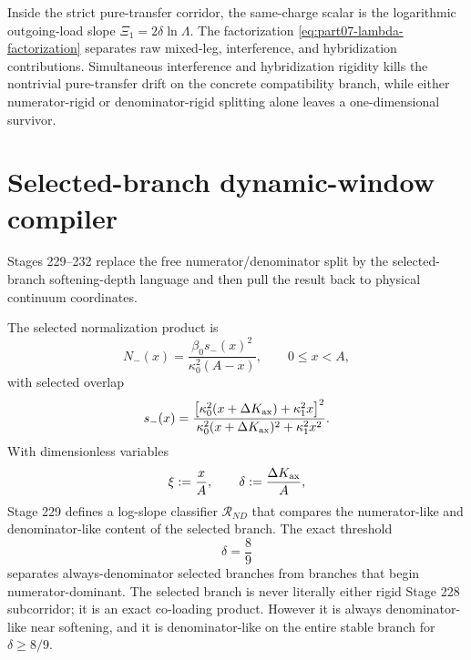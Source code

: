 \begin{theorem}
\label{thm:part07-pure-transfer-sieve}
Inside the strict pure-transfer corridor, the same-charge scalar is the logarithmic outgoing-load slope \(\Xi_1=2\delta\ln\Lambda\).  The factorization \cref{eq:part07-lambda-factorization} separates raw mixed-leg, interference, and hybridization contributions.  Simultaneous interference and hybridization rigidity kills the nontrivial pure-transfer drift on the concrete compatibility branch, while either numerator-rigid or denominator-rigid splitting alone leaves a one-dimensional survivor.
\end{theorem}


\section{Selected-branch dynamic-window compiler}
\label{sec:part07_same_charge_rigid_mouth:selected-branch-dynamic-window-compiler}

Stages 229--232 replace the free numerator/denominator split by the selected-branch softening-depth language and then pull the result back to physical continuum coordinates.

The selected normalization product is
\begin{equation}
\label{eq:part07-selected-nminus}
N_-(x)=\frac{\beta_0s_-(x)^2}{\kappa_0^2(A-x)},
\qquad
0\le x<A,
\end{equation}
with selected overlap
\begin{equation}
\label{eq:part07-selected-sminus}
s_-(x)=
\frac{\left[\kappa_0^2(x+\Delta K_{\rm ax})+\kappa_1^2x\right]^2}
{\kappa_0^2(x+\Delta K_{\rm ax})^2+\kappa_1^2x^2}.
\end{equation}
With dimensionless variables
\begin{equation}
\label{eq:part07-xi-delta-selected}
\xi:=\frac{x}{A},
\qquad
\delta:=\frac{\Delta K_{\rm ax}}{A},
\end{equation}
Stage 229 defines a log-slope classifier \(\mathcal R_{ND}\) that compares the numerator-like and denominator-like content of the selected branch.  The exact threshold
\begin{equation}
\label{eq:part07-delta-eight-ninths}
\delta=\frac89
\end{equation}
separates always-denominator selected branches from branches that begin numerator-dominant.  The selected branch is never literally either rigid Stage 228 subcorridor; it is an exact co-loading product.  However it is always denominator-like near softening, and it is denominator-like on the entire stable branch for \(\delta\ge8/9\).

